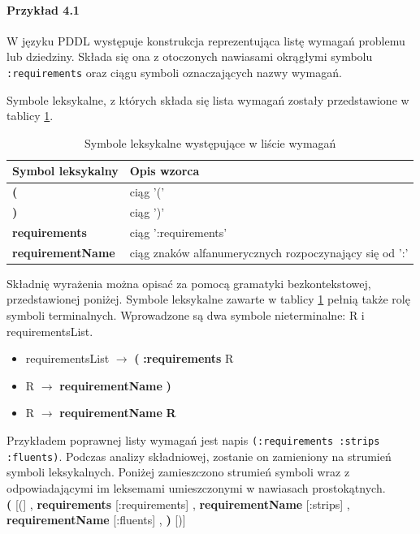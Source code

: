 \paragraph{Przykład 4.1}
W języku PDDL występuje konstrukcja reprezentująca listę wymagań problemu lub dziedziny.
Składa się ona z otoczonych nawiasami okrągłymi symbolu \texttt{:requirements} oraz
ciągu symboli oznaczających nazwy wymagań. 

Symbole leksykalne, z których składa się lista wymagań zostały przedstawione w tablicy
\ref{ana_lextable}.

\begin{table}[h]
  \centering
  \caption{Symbole leksykalne występujące w liście wymagań}
  \begin{tabular}{|l|l|}
    \hline
    Symbol leksykalny & Opis wzorca \\ \hline
    \textbf{(} & ciąg '(' \\ 
    \textbf{)} & ciąg ')' \\ 
    \textbf{requirements} & ciąg ':requirements' \\
    \textbf{requirementName} & ciąg znaków alfanumerycznych rozpoczynający się od ':' \\
    \hline
  \end{tabular}
  \label{ana_lextable}
\end{table}

Składnię wyrażenia można opisać za pomocą gramatyki bezkontekstowej, przedstawionej
poniżej. Symbole leksykalne zawarte w tablicy \ref{ana_lextable} pełnią także rolę symboli terminalnych.
Wprowadzone są dwa symbole nieterminalne: R i requirementsList.

\begin{itemize}
\item requirementsList $\rightarrow$ \textbf{(} \textbf{:requirements} R
\item R $\rightarrow$ \textbf{requirementName} \textbf{)}
\item R $\rightarrow$ \textbf{requirementName} \textbf{R}
\end{itemize}

Przykładem poprawnej listy wymagań jest napis \texttt{(:requirements :strips :fluents)}.
Podczas analizy składniowej, zostanie on zamieniony na strumień symboli leksykalnych.
Poniżej zamieszczono strumień symboli wraz z odpowiadającymi im leksemami umieszczonymi 
w nawiasach prostokątnych.\\
\textbf{(} [(] , \textbf{requirements} [:requirements] , \textbf{requirementName} [:strips] ,
\textbf{requirementName} [:fluents] , \textbf{)} [)]

